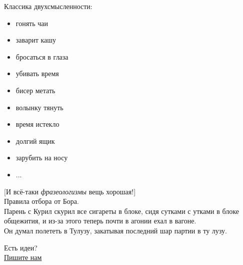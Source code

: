 \documentclass[12pt,a4paper]{article}
\begin{document}
Классика двухсмысленности:
\begin{itemize}
    \item гонять чаи\\
    \item заварит кашу\\
    \item бросаться в глаза\\
    \item убивать время\\
    \item бисер метать\\
    \item волынку тянуть\\
    \item время истекло\\
    \item долгий ящик\\
    \item зарубить на носу\\
    \item ...\\
\end{itemize}

[И всё-таки \emph{фразеологизмы} вещь хорошая!]\\


Правила отбора от Бора.\\


Парень с Курил скурил все сигареты в блоке, сидя сутками с утками 
в блоке общежития, и из-за этого теперь почти в агонии ехал в 
вагоне.\\


Он думал полететь в Тулузу, закатывая последний шар партии в ту 
лузу.\\
\newpage
\begin{center}
{\large Есть идеи?\\
\href{anto-kha0@rambler.ru}%
{Пишите нам}}
\end{center}
\end{document}
